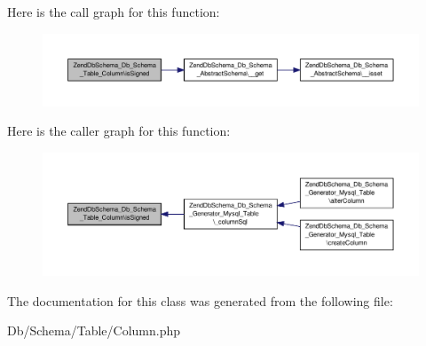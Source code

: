 Here is the call graph for this function\-:\nopagebreak
\begin{figure}[H]
\begin{center}
\leavevmode
\includegraphics[width=350pt]{classZendDbSchema__Db__Schema__Table__Column_a49887d783c47fa509e229ca61dd113ef_cgraph}
\end{center}
\end{figure}




Here is the caller graph for this function\-:\nopagebreak
\begin{figure}[H]
\begin{center}
\leavevmode
\includegraphics[width=350pt]{classZendDbSchema__Db__Schema__Table__Column_a49887d783c47fa509e229ca61dd113ef_icgraph}
\end{center}
\end{figure}




The documentation for this class was generated from the following file\-:\begin{DoxyCompactItemize}
\item 
Db/\-Schema/\-Table/Column.\-php\end{DoxyCompactItemize}
